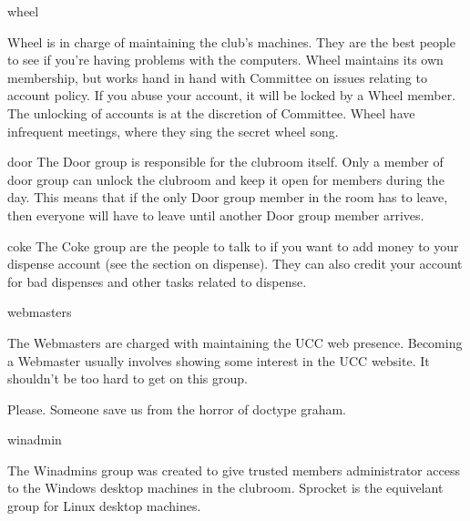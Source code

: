 \begin{uccgroup}{wheel}

Wheel is in charge of maintaining the club's machines. They are the best people to see if you're having problems with the computers. Wheel maintains its own membership, but works hand in hand with Committee on issues relating to account policy. If you abuse your account, it will be locked by a Wheel member. The unlocking of accounts is at the discretion of Committee. Wheel have infrequent meetings, where they sing the secret wheel song. %

\end{uccgroup}

\begin{uccgroup}{door}
The Door group is responsible for the clubroom itself. Only a member of door group can unlock the clubroom and keep it open for members during the day. This means that if the only Door group member in the room has to leave, then everyone will have to leave until another Door group member arrives.
\end{uccgroup}

\begin{uccgroup}{coke}
The Coke group are the people to talk to if you want to add money to your dispense account (see the section on dispense). They can also credit your account for bad dispenses and other tasks related to dispense.
\end{uccgroup}

\begin{uccgroup}{webmasters}

The Webmasters are charged with maintaining the UCC web presence. Becoming a Webmaster usually involves showing some interest in the UCC website. It shouldn't be too hard to get on this group.

 Please. Someone save us from the horror of doctype graham.
\end{uccgroup}

\begin{uccgroup}{winadmin}

The Winadmins group was created to give trusted members administrator access to the Windows desktop machines in the clubroom. Sprocket is the equivelant group for Linux desktop machines.
\end{uccgroup}






